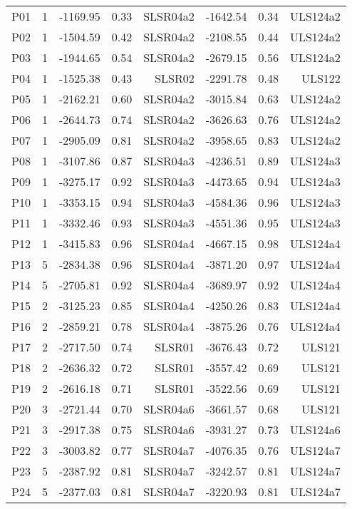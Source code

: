 \begin{center}
\begin{supertabular}{|c|c|rrr|rrr|}
P01 & 1 & -1169.95 & 0.33 & SLSR04a2 & -1642.54 & 0.34 & ULS124a2\\
P02 & 1 & -1504.59 & 0.42 & SLSR04a2 & -2108.55 & 0.44 & ULS124a2\\
P03 & 1 & -1944.65 & 0.54 & SLSR04a2 & -2679.15 & 0.56 & ULS124a2\\
P04 & 1 & -1525.38 & 0.43 & SLSR02 & -2291.78 & 0.48 & ULS122\\
P05 & 1 & -2162.21 & 0.60 & SLSR04a2 & -3015.84 & 0.63 & ULS124a2\\
P06 & 1 & -2644.73 & 0.74 & SLSR04a2 & -3626.63 & 0.76 & ULS124a2\\
P07 & 1 & -2905.09 & 0.81 & SLSR04a2 & -3958.65 & 0.83 & ULS124a2\\
P08 & 1 & -3107.86 & 0.87 & SLSR04a3 & -4236.51 & 0.89 & ULS124a3\\
P09 & 1 & -3275.17 & 0.92 & SLSR04a3 & -4473.65 & 0.94 & ULS124a3\\
P10 & 1 & -3353.15 & 0.94 & SLSR04a3 & -4584.36 & 0.96 & ULS124a3\\
P11 & 1 & -3332.46 & 0.93 & SLSR04a3 & -4551.36 & 0.95 & ULS124a3\\
P12 & 1 & -3415.83 & 0.96 & SLSR04a4 & -4667.15 & 0.98 & ULS124a4\\
P13 & 5 & -2834.38 & 0.96 & SLSR04a4 & -3871.20 & 0.97 & ULS124a4\\
P14 & 5 & -2705.81 & 0.92 & SLSR04a4 & -3689.97 & 0.92 & ULS124a4\\
P15 & 2 & -3125.23 & 0.85 & SLSR04a4 & -4250.26 & 0.83 & ULS124a4\\
P16 & 2 & -2859.21 & 0.78 & SLSR04a4 & -3875.26 & 0.76 & ULS124a4\\
P17 & 2 & -2717.50 & 0.74 & SLSR01 & -3676.43 & 0.72 & ULS121\\
P18 & 2 & -2636.32 & 0.72 & SLSR01 & -3557.42 & 0.69 & ULS121\\
P19 & 2 & -2616.18 & 0.71 & SLSR01 & -3522.56 & 0.69 & ULS121\\
P20 & 3 & -2721.44 & 0.70 & SLSR04a6 & -3661.57 & 0.68 & ULS121\\
P21 & 3 & -2917.38 & 0.75 & SLSR04a6 & -3931.27 & 0.73 & ULS124a6\\
P22 & 3 & -3003.82 & 0.77 & SLSR04a7 & -4076.35 & 0.76 & ULS124a7\\
P23 & 5 & -2387.92 & 0.81 & SLSR04a7 & -3242.57 & 0.81 & ULS124a7\\
P24 & 5 & -2377.03 & 0.81 & SLSR04a7 & -3220.93 & 0.81 & ULS124a7\\

\end{supertabular}
\end{center}
